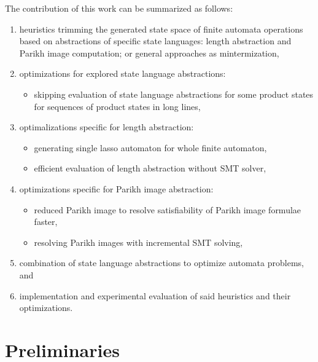 The contribution of this work can be summarized as follows:
\begin{enumerate}
    \item heuristics trimming the generated state space of finite automata operations based on abstractions of specific state languages: length abstraction and Parikh image computation; or general approaches as mintermization,

    \item optimizations for explored state language abstractions:
    \begin{itemize}
        \item skipping evaluation of state language abstractions for some product states for sequences of product states in long lines,
    \end{itemize}

    \item optimalizations specific for length abstraction:
    \begin{itemize}
        \item generating single lasso automaton for whole finite automaton,
        \item efficient evaluation of length abstraction without SMT solver,
    \end{itemize}

    \item optimizations specific for Parikh image abstraction:
    \begin{itemize}
        \item reduced Parikh image to resolve satisfiability of Parikh image formulae faster,
        \item resolving Parikh images with incremental SMT solving,
    \end{itemize}

    \item combination of state language abstractions to optimize automata problems, and

    \item implementation and experimental evaluation of said heuristics and their optimizations.
\end{enumerate}


\chapter{Preliminaries}

